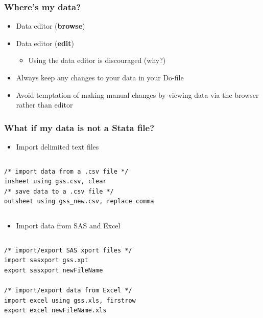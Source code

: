 \documentclass[table]{beamer}
\begin{document}
\begin{frame}
\frametitle{Where's my data?}
\label{sec-2-3}

\begin{itemize}
\item Data editor (\textbf{browse})
\item Data editor (\textbf{edit})
\begin{itemize}
\item Using the data editor is discouraged (why?)
\end{itemize}
\item Always keep any changes to your data in your Do-file
\item Avoid temptation of making manual changes by viewing data via the browser rather than editor
\end{itemize}
\end{frame}
\begin{frame}[fragile]
\frametitle{What if my data is not a Stata file?}
\label{sec-2-4}

\begin{itemize}
\item Import delimited text files
\end{itemize}
\vspace{-.5em} \begin{columns}  \begin{block}{}

\begin{verbatim}
/* import data from a .csv file */
insheet using gss.csv, clear
/* save data to a .csv file */
outsheet using gss_new.csv, replace comma
\end{verbatim}
\end{block} \end{columns}

\begin{itemize}
\item Import data from SAS and Excel
\end{itemize}
\vspace{-.5em} \begin{columns}  \begin{block}{}

\begin{verbatim}
/* import/export SAS xport files */
import sasxport gss.xpt
export sasxport newFileName

/* import/export data from Excel */
import excel using gss.xls, firstrow
export excel newFileName.xls
\end{verbatim}
\end{block} \end{columns}
  
\end{frame}
\end{document}
